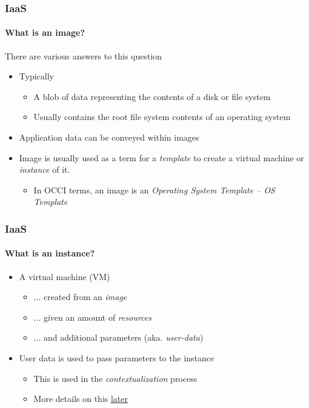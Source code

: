 \begin{frame}
\frametitle{IaaS}
\framesubtitle{What is an image?}
There are various answers to this question
\begin{itemize}
\item Typically
  \begin{itemize}
  \item A blob of data representing the contents of a disk or file system
  \item Usually contains the root file system contents of an operating system
  \end{itemize}
\item Application data can be conveyed within images
\item Image is usually used as a term for a \emph{template} to create
  a virtual machine or \emph{instance} of it.
  \begin{itemize}
  \item In OCCI terms, an image is an \emph{Operating System Template
    -- OS Template}
  \end{itemize}
\end{itemize}
\end{frame}

\begin{frame}
\frametitle{IaaS}
\framesubtitle{What is an instance?}
\begin{itemize}
\item A virtual machine (VM)
  \begin{itemize}
  \item ... created from an \emph{image}
  \item ... given an amount of \emph{resources}
  \item ... and additional parameters (aka. \emph{user-data})
  \end{itemize}
\item User data is used to pass parameters to the instance
  \begin{itemize}
  \item This is used in the \emph{contextualization} process
  \item More details on this \hyperlink{part_contextualization}{later}
  \end{itemize}
\end{itemize}
\end{frame}


